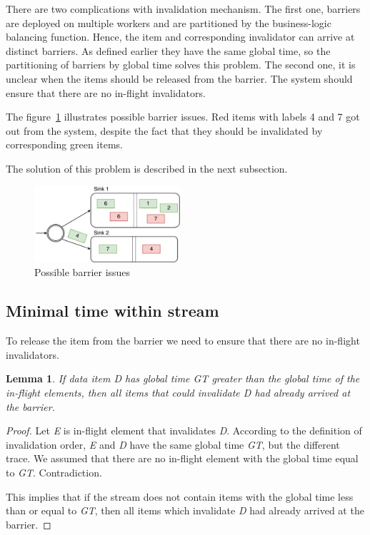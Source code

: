 There are two complications with invalidation mechanism. The first one, barriers are deployed on multiple workers and are partitioned by the business-logic balancing function. Hence, the item and corresponding invalidator can arrive at distinct barriers. As defined earlier they have the same global time, so the partitioning of barriers by global time solves this problem. The second one, it is unclear when the items should be released from the barrier. The system should ensure that there are no in-flight invalidators. 

The figure~\ref{invalidation-problems-figure} illustrates possible barrier issues. Red items with labels 4 and 7 got out from the system, despite the fact that they should be invalidated by corresponding green items. 

The solution of this problem is described in the next subsection. 

\begin{figure}[htbp]
  \centering
  \includegraphics[width=0.48\textwidth]{pics/invalidation_problems}
  \caption{Possible barrier issues}
  \label {invalidation-problems-figure}
\end{figure}

\subsection{Minimal time within stream}

To release the item from the barrier we need to ensure that there are no in-flight invalidators. 

\newtheorem{minimal-time-claim}{Lemma}

\begin{minimal-time-claim}
  If data item {\it D} has global time {\it GT} greater than the global time of the in-flight elements, then all items that could invalidate {\it D} had already arrived at the barrier.
\end{minimal-time-claim}

\begin{proof}
  Let {\it E} is in-flight element that invalidates {\it D}. According to the definition of invalidation order, {\it E} and {\it D} have the same global time {\it GT}, but the different trace. We assumed that there are no in-flight element with the global time equal to {\it GT}. Contradiction.

  This implies that if the stream does not contain items with the global time less than or equal to {\it GT}, then all items which invalidate {\it D} had already arrived at the barrier. 
\end{proof}

